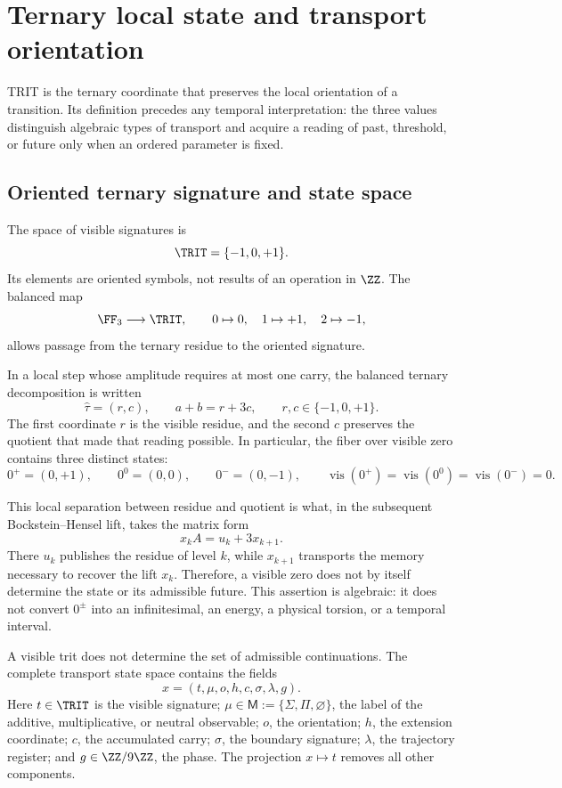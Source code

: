 \ifdefined\HMTTRITFormal
\chapter{Ternary local state and transport orientation}
\label{chap:trit}

TRIT is the ternary coordinate that preserves the local orientation of a
transition. Its definition precedes any temporal interpretation: the
three values distinguish algebraic types of transport and acquire a
reading of past, threshold, or future only when an ordered parameter is fixed.

\section{Oriented ternary signature and state space}

The space of visible signatures is
\[
\TRIT=\{-1,0,+1\}.
\]
Its elements are oriented symbols, not results of an operation in
\(\ZZ\). The balanced map
\[
\FF_3\longrightarrow\TRIT,
\qquad0\mapsto0,\quad1\mapsto+1,\quad2\mapsto-1,
\]
allows passage from the ternary residue to the oriented signature.

\begin{definition}
\label{def:trit-levantado-carry-rev8}
In a local step whose amplitude requires at most one carry, the
balanced ternary decomposition is written
\[
 \widehat\tau=(r,c),\qquad
 a+b=r+3c,
 \qquad r,c\in\{-1,0,+1\}.
\]
The first coordinate \(r\) is the visible residue, and the second \(c\) preserves
the quotient that made that reading possible.  In particular, the fiber over
visible zero contains three distinct states:
\[
 0^+=(0,+1),\qquad 0^0=(0,0),\qquad 0^-=(0,-1),
 \qquad
 \operatorname{vis}(0^+)=\operatorname{vis}(0^0)
 =\operatorname{vis}(0^-)=0.
\]
\end{definition}

This local separation between residue and quotient is what, in the
subsequent Bockstein--Hensel lift, takes the matrix form
\[
 x_k A=u_k+3x_{k+1}.
\]
There \(u_k\) publishes the residue of level \(k\), while \(x_{k+1}\)
transports the memory necessary to recover the lift \(x_k\).  Therefore,
a visible zero does not by itself determine the state or its admissible future.
This assertion is algebraic: it does not convert \(0^\pm\) into an infinitesimal,
an energy, a physical torsion, or a temporal interval.

A visible trit does not determine the set of admissible continuations. The
complete transport state space contains the fields
\[
x=(t,\mu,o,h,c,\sigma,\lambda,g).
\]
Here \(t\in\TRIT\) is the visible signature; \(\mu\in\mathsf M:=\{\Sigma,\Pi,\varnothing\}\), the label of the additive, multiplicative, or neutral observable; \(o\), the orientation; \(h\), the extension coordinate; \(c\), the accumulated carry; \(\sigma\), the boundary signature; \(\lambda\), the trajectory register; and \(g\in\ZZ/9\ZZ\), the phase. The projection \(x\mapsto t\) removes all other components.

